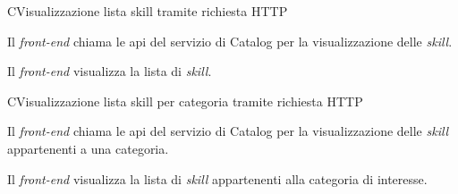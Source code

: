 \begin{usecase}{2}{C}{Visualizzazione lista skill tramite richiesta HTTP}



	\begin{ucscenarioprincipale}
		\item Il \textit{front-end} chiama le \acrshort{api} del servizio di Catalog per la visualizzazione delle \textit{skill}.
		\item Il \textit{front-end} visualizza la lista di \textit{skill}.
	\end{ucscenarioprincipale}


	\label{uc:vis-skill-http-c}
\end{usecase}

\begin{usecase}{2.1}{C}{Visualizzazione lista skill per categoria tramite richiesta HTTP}



	\begin{ucscenarioprincipale}
		\item Il \textit{front-end} chiama le \acrshort{api} del servizio di Catalog per la visualizzazione delle \textit{skill} appartenenti a una categoria.
		\item Il \textit{front-end} visualizza la lista di \textit{skill} appartenenti alla categoria di interesse.
	\end{ucscenarioprincipale}


	\label{uc:vis-skill-category-http-c}
\end{usecase}

